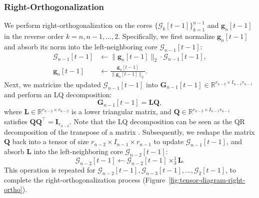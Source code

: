 \documentclass[a4paper, 11pt]{article}
\newcommand{\ttimes}[2]{\times_{#1}^{#2}}
\theoremstyle{plain}
\theoremstyle{definition}
\theoremstyle{remark}
\begin{document}
\subsubsection{Right-Orthogonalization}
We perform right-orthogonalization on the cores $\{\mathcal{G}_k[t-1]\}_{k=1}^{n-1}$ and $\bm{g}_n[t-1]$ in the reverse order $k=n, n-1, \ldots, 2$.
Specifically, we first normalize $\bm{g}_n[t-1]$ and absorb its norm into the left-neighboring core $\mathcal{G}_{n-1}[t-1]$:
\begin{align*}
    \mathcal{G}_{n-1}[t-1] &\leftarrow \|\bm{g}_n[t-1]\|_2 \cdot \mathcal{G}_{n-1}[t-1], \\
    \bm{g}_n[t-1] &\leftarrow \frac{\bm{g}_n[t-1]}{\|\bm{g}_n[t-1]\|_2}.
\end{align*}
Next, we matricize the updated $\mathcal{G}_{n-1}[t-1]$ into $\mathbf{G}_{n-1}[t-1] \in \mathbb{R}^{r_{n-2} \times I_{n-1} r_{n-1}}$ and perform an LQ decomposition:
\begin{equation*}
    \mathbf{G}_{n-1}[t-1] = \mathbf{L} \mathbf{Q},
\end{equation*}
where $\mathbf{L} \in \mathbb{R}^{r_{n-2} \times r_{n-2}}$ is a lower triangular matrix, and $\mathbf{Q} \in \mathbb{R}^{r_{n-2} \times I_{n-1} r_{n-1}}$ satisfies $\mathbf{Q} \mathbf{Q}^\top = \mathbf{I}_{r_{n-2}}$.
Note that the LQ decomposition can be seen as the QR decomposition of the transpose of a matrix \citep{Matrix-Computations}.
Subsequently, we reshape the matrix $\mathbf{Q}$ back into a tensor of size $r_{n-2} \times I_{n-1} \times r_{n-1}$ to update $\mathcal{G}_{n-1}[t-1]$, and absorb $\mathbf{L}$ into the left-neighboring core $\mathcal{G}_{n-2}[t-1]$:
\begin{equation*}
    \mathcal{G}_{n-2}[t-1] \leftarrow \mathcal{G}_{n-2}[t-1] \ttimes{3}{1} \mathbf{L}.
\end{equation*}
This operation is repeated for $\mathcal{G}_{n-2}[t-1], \mathcal{G}_{n-3}[t-1], \ldots, \mathcal{G}_2[t-1]$, to complete the right-orthogonalization process (Figure~\ref{fig:tensor-diagram-right-ortho}).
\end{document}
